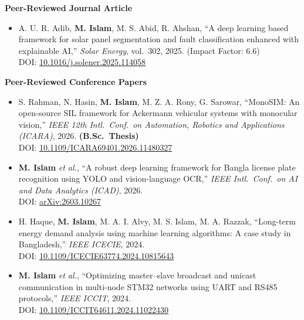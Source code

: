 \documentclass[10.5pt,letterpaper]{article}
\begin{document}
\textbf{Peer-Reviewed Journal Article}
\begin{itemize}
    \item A. U. R. Adib, \textbf{M. Islam}, M. S. Abid, R. Ahshan, ``A deep learning based framework for solar panel segmentation and fault classification enhanced with explainable AI,'' \textit{Solar Energy}, vol.\ 302, 2025. (Impact Factor: 6.6) \\
    DOI: \href{https://doi.org/10.1016/j.solener.2025.114058}{10.1016/j.solener.2025.114058}
\end{itemize}

\textbf{Peer-Reviewed Conference Papers}
\begin{itemize}
    \item S. Rahman, N. Hasin, \textbf{M. Islam}, M. Z. A. Rony, G. Sarowar, ``MonoSIM: An open-source SIL framework for Ackermann vehicular systems with monocular vision,'' \textit{IEEE 12th Intl.\ Conf.\ on Automation, Robotics and Applications (ICARA)}, 2026. \textbf{(B.Sc.\ Thesis)} \\
    DOI: \href{https://doi.org/10.1109/ICARA69401.2026.11480327}{10.1109/ICARA69401.2026.11480327}

    \item \textbf{M. Islam} \textit{et al.}, ``A robust deep learning framework for Bangla license plate recognition using YOLO and vision-language OCR,'' \textit{IEEE Intl.\ Conf.\ on AI and Data Analytics (ICAD)}, 2026. \\
    DOI: \href{https://doi.org/10.48550/arXiv.2603.10267}{arXiv:2603.10267}

    \item H. Haque, \textbf{M. Islam}, M. A. I. Alvy, M. S. Islam, M. A. Razzak, ``Long-term energy demand analysis using machine learning algorithms: A case study in Bangladesh,'' \textit{IEEE ICECIE}, 2024. \\
    DOI: \href{https://doi.org/10.1109/ICECIE63774.2024.10815643}{10.1109/ICECIE63774.2024.10815643}

    \item \textbf{M. Islam} \textit{et al.}, ``Optimizing master--slave broadcast and unicast communication in multi-node STM32 networks using UART and RS485 protocols,'' \textit{IEEE ICCIT}, 2024. \\
    DOI: \href{https://doi.org/10.1109/ICCIT64611.2024.11022430}{10.1109/ICCIT64611.2024.11022430}
\end{itemize}

\end{document}
